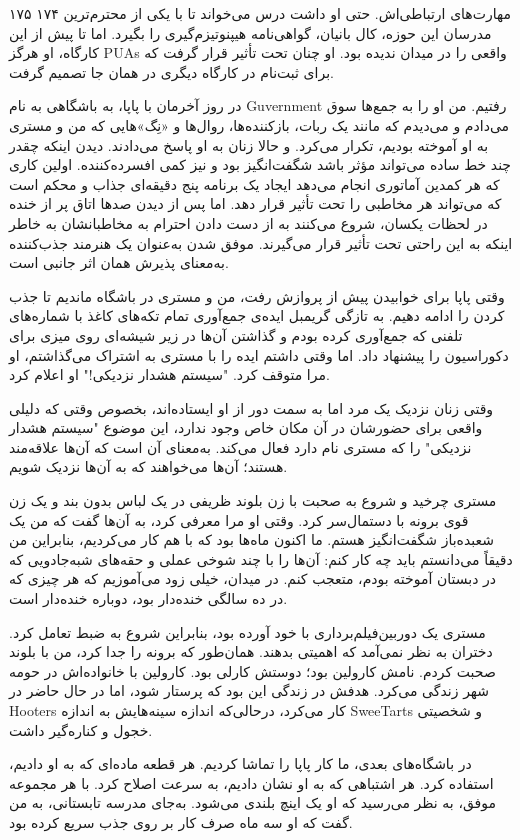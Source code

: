 ۱۷۵  
۱۷۴  
مهارت‌های ارتباطی‌اش. حتی او داشت درس می‌خواند تا با یکی از محترم‌ترین مدرسان این حوزه، کال بانیان، گواهی‌نامه هیپنوتیزم‌گیری را بگیرد. اما تا پیش از این کارگاه، او هرگز PUAs واقعی را در میدان ندیده بود. او چنان تحت تأثیر قرار گرفت که برای ثبت‌نام در کارگاه دیگری در همان جا تصمیم گرفت.  

در روز آخرمان با پاپا، به باشگاهی به نام Guvernment رفتیم. من او را به جمع‌ها سوق می‌دادم و می‌دیدم که مانند یک ربات، بازکننده‌ها، روال‌ها و «نِگ»‌هایی که من و مستری به او آموخته بودیم، تکرار می‌کرد. و حالا زنان به او پاسخ می‌دادند. دیدن اینکه چقدر چند خط ساده می‌تواند مؤثر باشد شگفت‌انگیز بود و نیز کمی افسرده‌کننده. اولین کاری که هر کمدین آماتوری انجام می‌دهد ایجاد یک برنامه پنج دقیقه‌ای جذاب و محکم است که می‌تواند هر مخاطبی را تحت تأثیر قرار دهد. اما پس از دیدن صدها اتاق پر از خنده در لحظات یکسان، شروع می‌کنند به از دست دادن احترام به مخاطبانشان به خاطر اینکه به این راحتی تحت تأثیر قرار می‌گیرند. موفق شدن به‌عنوان یک هنرمند جذب‌کننده به‌معنای پذیرش همان اثر جانبی است.  

وقتی پاپا برای خوابیدن پیش از پروازش رفت، من و مستری در باشگاه ماندیم تا جذب کردن را ادامه دهیم. به تازگی گریمبل ایده‌ی جمع‌آوری تمام تکه‌های کاغذ با شماره‌های تلفنی که جمع‌آوری کرده بودم و گذاشتن آن‌ها در زیر شیشه‌ای روی میزی برای دکوراسیون را پیشنهاد داد. اما وقتی داشتم ایده را با مستری به اشتراک می‌گذاشتم، او مرا متوقف کرد. "سیستم هشدار نزدیکی!" او اعلام کرد.  

وقتی زنان نزدیک یک مرد اما به سمت دور از او ایستاده‌اند، بخصوص وقتی که دلیلی واقعی برای حضورشان در آن مکان خاص وجود ندارد، این موضوع "سیستم هشدار نزدیکی" را که مستری نام دارد فعال می‌کند. به‌معنای آن است که آن‌ها علاقه‌مند هستند؛ آن‌ها می‌خواهند که به آن‌ها نزدیک شویم.  

مستری چرخید و شروع به صحبت با زن بلوند ظریفی در یک لباس بدون بند و یک زن قوی برونه با دستمال‌سر کرد. وقتی او مرا معرفی کرد، به آن‌ها گفت که من یک شعبده‌باز شگفت‌انگیز هستم. ما اکنون ماه‌ها بود که با هم کار می‌کردیم، بنابراین من دقیقاً می‌دانستم باید چه کار کنم: آن‌ها را با چند شوخی عملی و حقه‌های شبه‌جادویی که در دبستان آموخته بودم، متعجب کنم. در میدان، خیلی زود می‌آموزیم که هر چیزی که در ده سالگی خنده‌دار بود، دوباره خنده‌دار است.  

مستری یک دوربین‌فیلم‌برداری با خود آورده بود، بنابراین شروع به ضبط تعامل کرد. دختران به نظر نمی‌آمد که اهمیتی بدهند. همان‌طور که برونه را جدا کرد، من با بلوند صحبت کردم. نامش کارولین بود؛ دوستش کارلی بود. کارولین با خانواده‌اش در حومه شهر زندگی می‌کرد. هدفش در زندگی این بود که پرستار شود، اما در حال حاضر در Hooters کار می‌کرد، درحالی‌که اندازه سینه‌هایش به اندازه SweeTarts و شخصیتی خجول و کناره‌گیر داشت.  

در باشگاه‌های بعدی، ما کار پاپا را تماشا کردیم. هر قطعه ماده‌ای که به او دادیم، استفاده کرد. هر اشتباهی که به او نشان دادیم، به سرعت اصلاح کرد. با هر مجموعه موفق، به نظر می‌رسید که او یک اینچ بلندی می‌شود. به‌جای مدرسه تابستانی، به من گفت که او سه ماه صرف کار بر روی جذب سریع کرده بود.